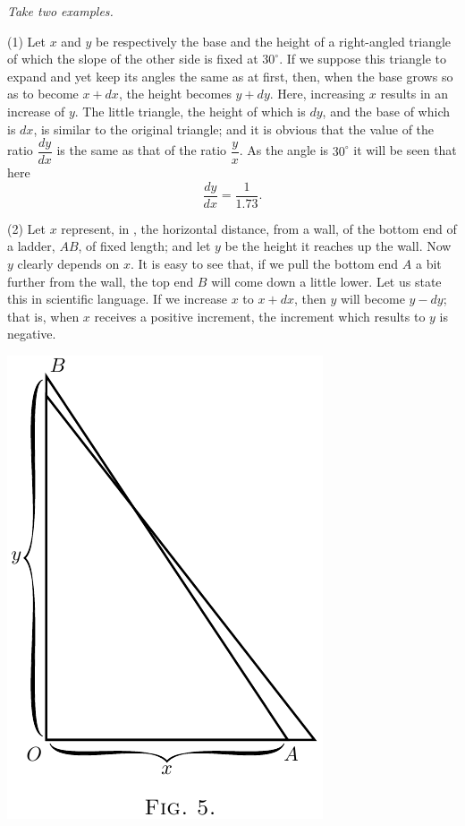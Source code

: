 \documentclass{ximera}
\begin{document}
\textit{Take two examples.}

(1) Let $x$ and $y$ be respectively the base and the
height of a right-angled triangle 
of which the slope of the other side is fixed at $30 ^{\circ}$. If we
suppose this triangle to expand and yet keep its
angles the same as at first, then, when the base grows
so as to become $x + dx$, the height becomes $y + dy$.
Here, increasing $x$ results in an increase of $y$. The
little triangle, the height of which is $dy$, and the base
of which is $dx$, is similar to the original triangle; and
it is obvious that the value of the ratio $\dfrac{dy}{dx}$ is the
same as that of the ratio $\dfrac{y}{x}$. As the angle is $30 ^{\circ}$ it
will be seen that here
$$
\frac{dy}{dx} = \frac{1}{1.73}.
$$

(2) Let $x$ represent, in %
, the horizontal distance,
from a wall, of the bottom end of a ladder, $AB$,
of fixed length; and let $y$ be the height it
reaches up the wall. Now $y$ clearly depends on $x$.
It is easy to see that, if we pull the bottom end $A$ a
bit further from the wall, the top end $B$ will come
down a little lower. Let us state this in scientific
language. If we increase $x$ to $x + dx$, then $y$ will
become $y - dy$; that is, when $x$ receives a positive
increment, the increment which results to $y$ is
negative.

\begin{image}
\includegraphics{fig5.png}
\end{image}
\end{document}
